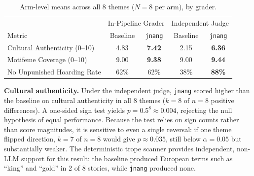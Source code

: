 \documentclass[pdflatex,sn-mathphys-num]{sn-jnl}%
\theoremstyle{thmstyleone}%
\theoremstyle{thmstyletwo}%
\theoremstyle{thmstylethree}%
\begin{document}

\begin{table}[h]
\caption{Arm-level means across all 8 themes ($N=8$ per arm), by grader.}\label{tab:results}
\begin{tabular}{@{}lcccc@{}}
\toprule
 & \multicolumn{2}{c}{In-Pipeline Grader} & \multicolumn{2}{c}{Independent Judge} \\
Metric & Baseline & \texttt{jnang} & Baseline & \texttt{jnang} \\
\midrule
Cultural Authenticity (0--10) & 4.83 & \textbf{7.42} & 2.15 & \textbf{6.36} \\
Motifeme Coverage (0--10) & 9.00 & \textbf{9.38} & 9.00 & \textbf{9.44} \\
No Unpunished Hoarding Rate & 62\% & 62\% & 38\% & \textbf{88\%} \\
\bottomrule
\end{tabular}
\end{table}




\noindent\textbf{Cultural authenticity.} Under the independent judge, \texttt{jnang} scored higher than the baseline on cultural authenticity in all 8 themes ($k = 8$ of $n = 8$ positive differences). A one-sided sign test yields $p = 0.5^{8} \approx 0.004$, rejecting the null hypothesis of equal performance. Because the test relies on sign counts rather than score magnitudes, it is sensitive to even a single reversal: if one theme flipped direction, $k = 7$ of $n = 8$ would give $p \approx 0.035$, still below $\alpha = 0.05$ but substantially weaker. The deterministic trope scanner provides independent, non-LLM support for this result: the baseline produced European terms such as ``king'' and ``gold'' in 2 of 8 stories, while \texttt{jnang} produced none.
\end{document}
